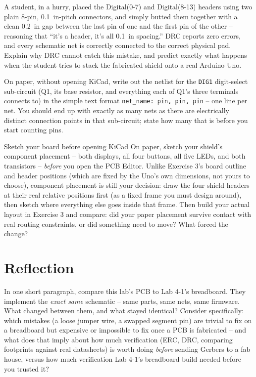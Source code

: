 \documentclass[11pt]{article}
\begin{document}
\begin{bug}
A student, in a hurry, placed the Digital(0-7) and Digital(8-13) headers using two
plain 8-pin, 0.1~in-pitch connectors, and simply butted them together with a clean
0.2~in gap between the last pin of one and the first pin of the other -- reasoning
that ``it's a header, it's all 0.1~in spacing.'' DRC reports zero errors, and every
schematic net is correctly connected to the correct physical pad. Explain why DRC
cannot catch this mistake, and predict exactly what happens when the student tries
to stack the fabricated shield onto a real Arduino Uno.
\end{bug}

\begin{writecode}
On paper, without opening KiCad, write out the netlist for the \texttt{DIG1}
digit-select sub-circuit (Q1, its base resistor, and everything each of Q1's three
terminals connects to) in the simple text format \texttt{net\_name: pin, pin, pin}
-- one line per net. You should end up with exactly as many nets as there are
electrically distinct connection points in that sub-circuit; state how many that is
before you start counting pins.
\end{writecode}

\begin{drawex}{Sketch your board before opening KiCad}
On paper, sketch your shield's component placement -- both displays, all four
buttons, all five LEDs, and both transistors -- \emph{before} you open the PCB
Editor. Unlike Exercise 3's board outline and header positions (which are fixed by
the Uno's own dimensions, not yours to choose), component placement is still your
decision: draw the four shield headers at their real relative positions first (as
a fixed frame you must design around), then sketch where everything else goes
inside that frame. Then build your actual layout in Exercise 3 and compare: did
your paper placement survive contact with real routing constraints, or did
something need to move? What forced the change?
\end{drawex}

\section*{Reflection}

In one short paragraph, compare this lab's PCB to Lab 4-1's breadboard. They
implement the \emph{exact same} schematic -- same parts, same nets, same firmware.
What changed between them, and what stayed identical? Consider specifically: which
mistakes (a loose jumper wire, a swapped segment pin) are trivial to fix on a
breadboard but expensive or impossible to fix once a PCB is fabricated -- and what
does that imply about how much verification (ERC, DRC, comparing footprints against
real datasheets) is worth doing \emph{before} sending Gerbers to a fab house, versus
how much verification Lab 4-1's breadboard build needed before you trusted it?
\end{document}
